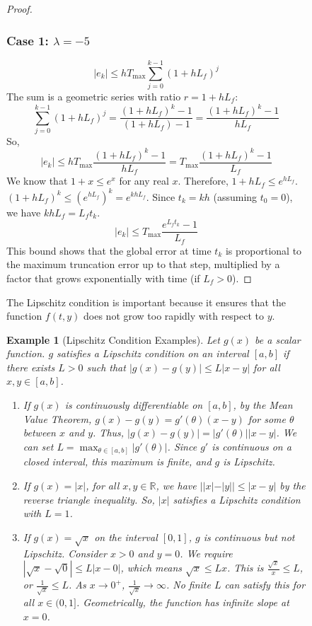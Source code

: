 \documentclass{article}
\newtheorem{example}{Example}
\newtheorem{example}{Example}
\begin{document}
\begin{figure}[h]
\begin{proof}
\subsubsection{Case 1: $\lambda = -5$}
\[ |e_k| \le h T_{\max} \sum_{j=0}^{k-1} (1 + h L_f)^j \]
The sum is a geometric series with ratio $r = 1 + h L_f$:
\[ \sum_{j=0}^{k-1} (1 + h L_f)^j = \frac{(1 + h L_f)^k - 1}{(1 + h L_f) - 1} = \frac{(1 + h L_f)^k - 1}{h L_f} \]
So,
\[ |e_k| \le h T_{\max} \frac{(1 + h L_f)^k - 1}{h L_f} = T_{\max} \frac{(1 + h L_f)^k - 1}{L_f} \]
We know that $1 + x \le e^x$ for any real $x$. Therefore, $1 + h L_f \le e^{h L_f}$.
$(1 + h L_f)^k \le (e^{h L_f})^k = e^{k h L_f}$.
Since $t_k = k h$ (assuming $t_0 = 0$), we have $k h L_f = L_f t_k$.
\[ |e_k| \le T_{\max} \frac{e^{L_f t_k} - 1}{L_f} \]
This bound shows that the global error at time $t_k$ is proportional to the maximum truncation error up to that step, multiplied by a factor that grows exponentially with time (if $L_f > 0$).
\end{proof}
The Lipschitz condition is important because it ensures that the function $f(t, y)$ does not grow too rapidly with respect to $y$.
\begin{example}[Lipschitz Condition Examples]
Let $g(x)$ be a scalar function. $g$ satisfies a Lipschitz condition on an interval $[a, b]$ if there exists $L > 0$ such that $|g(x) - g(y)| \le L |x - y|$ for all $x, y \in [a, b]$.
\begin{enumerate}
    \item If $g(x)$ is continuously differentiable on $[a, b]$, by the Mean Value Theorem, $g(x) - g(y) = g'(\theta)(x - y)$ for some $\theta$ between $x$ and $y$. Thus, $|g(x) - g(y)| = |g'(\theta)| |x - y|$. We can set $L = \max_{\theta \in [a, b]} |g'(\theta)|$. Since $g'$ is continuous on a closed interval, this maximum is finite, and $g$ is Lipschitz.
    \item If $g(x) = |x|$, for all $x, y \in \mathbb{R}$, we have $| |x| - |y| | \le |x - y|$ by the reverse triangle inequality. So, $|x|$ satisfies a Lipschitz condition with $L=1$.
    \item If $g(x) = \sqrt{x}$ on the interval $[0, 1]$, $g$ is continuous but not Lipschitz. Consider $x > 0$ and $y = 0$. We require $|\sqrt{x} - \sqrt{0}| \le L |x - 0|$, which means $\sqrt{x} \le L x$. This is $\frac{\sqrt{x}}{x} \le L$, or $\frac{1}{\sqrt{x}} \le L$. As $x \to 0^+$, $\frac{1}{\sqrt{x}} \to \infty$. No finite $L$ can satisfy this for all $x \in (0, 1]$. Geometrically, the function has infinite slope at $x=0$.
\end{enumerate}
\end{example}

\end{figure}
\end{document}

